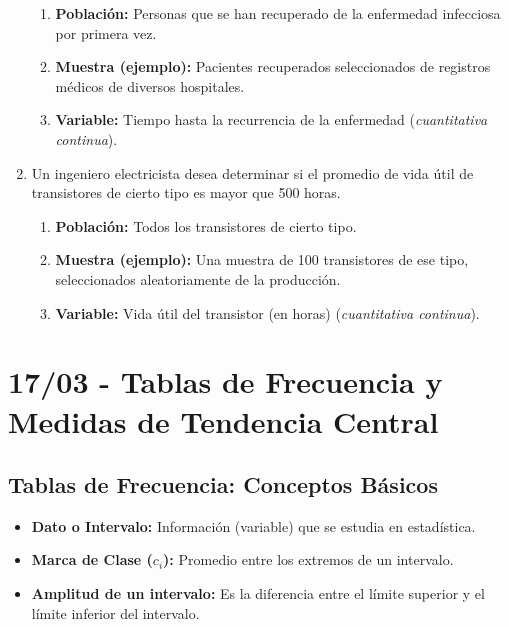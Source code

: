 \documentclass[12pt, letterpaper]{article}
\begin{document}
\begin{enumerate}
        \begin{enumerate}
            \item \textbf{Población:} Personas que se han recuperado de la enfermedad infecciosa por primera vez.
            \item \textbf{Muestra (ejemplo):} Pacientes recuperados seleccionados de registros médicos de diversos hospitales.
            \item \textbf{Variable:} Tiempo hasta la recurrencia de la enfermedad (\textit{cuantitativa continua}).
        \end{enumerate}
    \item Un ingeniero electricista desea determinar si el promedio de vida útil de transistores de cierto tipo es mayor que 500 horas.
        \begin{enumerate}
            \item \textbf{Población:} Todos los transistores de cierto tipo.
            \item \textbf{Muestra (ejemplo):} Una muestra de 100 transistores de ese tipo, seleccionados aleatoriamente de la producción.
            \item \textbf{Variable:} Vida útil del transistor (en horas) (\textit{cuantitativa continua}).
        \end{enumerate}
\end{enumerate}
\newpage

\section{17/03 - Tablas de Frecuencia y Medidas de Tendencia Central}

\subsection{Tablas de Frecuencia: Conceptos Básicos}
\begin{itemize}
    \item \textbf{Dato o Intervalo:} Información (variable) que se estudia en estadística.
    \item \textbf{Marca de Clase ($c_i$):} Promedio entre los extremos de un intervalo.
    \item \textbf{Amplitud de un intervalo:} Es la diferencia entre el límite superior y el límite inferior del intervalo.
\end{itemize}
\end{document}
